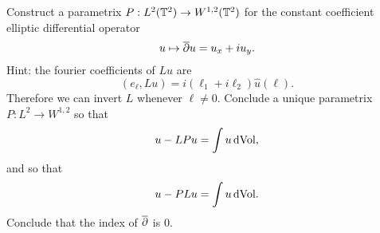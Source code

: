 \begin{xca}
  Construct a parametrix $P:L^{2}(\mathbb{T}^{2})\to W^{1,2}(\mathbb{T}^{2})$ for the constant coefficient elliptic differential operator
  \begin{equation*}
    u\mapsto \overline{\partial} u=u_{x}+iu_{y}.
  \end{equation*}
  Hint: the fourier coefficients of $Lu$ are
  \begin{equation*}
    (e_{\ell},Lu)=i(\ell_{1}+i\ell_{2})\hat{u}(\ell).
  \end{equation*}
  Therefore we can invert $L$ whenever $\ell\ne 0$. Conclude a unique parametrix $P:L^{2}\to W^{1,2}$ so that
  \begin{equation*}
    u-LPu=\int u\,\mathrm{d}\mathrm{Vol},
  \end{equation*}
  and so that
  \begin{equation*}
    u-PLu=\int u\,\mathrm{d}\mathrm{Vol}.
  \end{equation*}
  Conclude that the index of $\overline{\partial}$ is $0$.
\end{xca}

